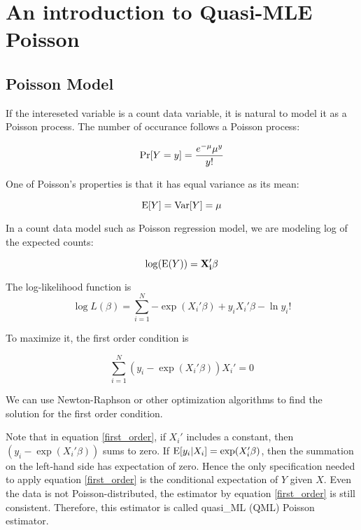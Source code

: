 \chapter{An introduction to Quasi-MLE Poisson}

\section{Poisson Model}
  
If the intereseted variable is a count data variable, it is natural to model it as a Poisson process.  The number of occurance follows a Poisson process:

\begin{equation}
{\rm Pr} [Y=y]=\frac{e^{-\mu} \mu^y}{y! }
\end{equation}

One of Poisson's properties is that it has equal variance as its mean:

\begin{equation}
{\rm E} [Y]={\rm Var} [Y]=\mu
\end{equation}


In a count data model such as Poisson regression model, we are modeling log of the expected counts:

\begin{equation}
\log ({\rm E}( Y) )=\bf X_i' \beta
\end{equation}

The log-likelihood function is
\begin{equation}
\log L(\beta)= \sum_{i=1}^N {- \exp (X_i' \beta) + y_i X_i' \beta - \ln y_i!}
\end{equation}

To maximize it, the first order condition is

\begin{equation}
\sum_{i=1}^N (y_i - \exp (X_i' \beta) )X_i'=0 \label{first_order}
\end{equation}

We can use Newton-Raphson or other optimization algorithms to find the solution for the first order condition.  

Note that in equation \ref{first_order}, if $X_i'$ includes a constant, then $(y_i - \exp (X_i' \beta) )$ sums to zero.  If ${\rm E} [y_i|X_i] = \exp (X_i' \beta)$, then the summation on the left-hand side has expectation of zero.  Hence the only specification needed to apply equation \ref{first_order} is the conditional expectation of $Y$ given $X$.  Even the data is not Poisson-distributed, the estimator by equation \ref{first_order} is still consistent.  Therefore, this estimator is called quasi\_ML (QML) Poisson estimator.


